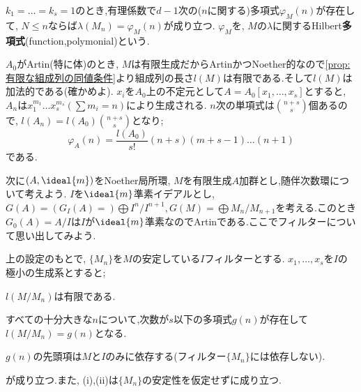 \begin{defi}[Hilbert多項式]\label{defi:Hilbert多項式}
	$k_1=\dots=k_s=1$のとき,有理係数で$d-1$次の($n$に関する)多項式$\varphi_M(n)$が存在して, $N
	\leq n$ならば$\lambda(M_n)=\varphi_M(n)$が成り立つ. $\varphi_M$を, $M$の$\lambda$に関するHilbert\textbf{多項式}(function,polymonial)という.
\end{defi}

$A_0$がArtin(特に体)のとき, $M$は有限生成だからArtinかつNoether的なので\ref{prop:有限な組成列の同値条件}より組成列の長さ$l(M)$は有限である.そして$l(M)$は加法的である(確かめよ). $x_i$を$A_0$上の不定元として$A=A_0[x_1,\dots,x_s]$とすると, $A_n$は$x_1^{m_1}\dots x_s^{m_s} (\sum m_i=n)$により生成される. $n$次の単項式は$\binom{n+s}{s}$個あるので, $l(A_n)=l(A_0)\binom{n+s}{s}$となり;
\[\varphi_A(n)=\frac{l(A_0)}{s!}(n+s)(m+s-1)\dots(n+1)\]
である.

次に$(A,\ideal{m})$をNoether局所環, $M$を有限生成$A$加群とし,随伴次数環について考えよう. $I$を$\ideal{m}$準素イデアルとし, $G(A)=(G_I(A)=)\bigoplus I^n/I^{n+1}, G(M)=\bigoplus M_n/M_{n+1}$を考える.このとき$G_0(A)=A/I$は$I$が$\ideal{m}$準素なのでArtinである.ここでフィルターについて思い出してみよう.

\begin{prop}\label{prop:フィルターとHilbert多項式}
	上の設定のもとで, $\{M_n\}$を$M$の安定している$I$フィルターとする. $x_1,\dots,x_s$を$I$の極小の生成系とすると;
	\begin{sakura}
		\item $l(M/M_n)$は有限である.
		\item すべての十分大きな$n$について,次数が$s$以下の多項式$g(n)$が存在して$l(M/M_n)=g(n)$となる.
		\item $g(n)$の先頭項は$M$と$I$のみに依存する(フィルター$\{M_n\}$には依存しない).
	\end{sakura}
	が成り立つ.また, (i),(ii)は$\{M_n\}$の安定性を仮定せずに成り立つ.
\end{prop}

